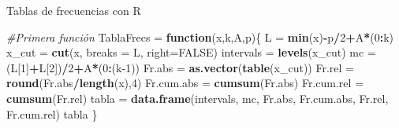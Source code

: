 \documentclass[
  ignorenonframetext,
  aspectratio=169]{beamer}
\newenvironment{Shaded}{\begin{snugshade}}{\end{snugshade}}
\newcommand{\AttributeTok}[1]{\textcolor[rgb]{0.13,0.29,0.53}{#1}}
\newcommand{\CommentTok}[1]{\textcolor[rgb]{0.56,0.35,0.01}{\textit{#1}}}
\newcommand{\ConstantTok}[1]{\textcolor[rgb]{0.56,0.35,0.01}{#1}}
\newcommand{\ControlFlowTok}[1]{\textcolor[rgb]{0.13,0.29,0.53}{\textbf{#1}}}
\newcommand{\DecValTok}[1]{\textcolor[rgb]{0.00,0.00,0.81}{#1}}
\newcommand{\FunctionTok}[1]{\textcolor[rgb]{0.13,0.29,0.53}{\textbf{#1}}}
\newcommand{\NormalTok}[1]{#1}
\newcommand{\OtherTok}[1]{\textcolor[rgb]{0.56,0.35,0.01}{#1}}
\newcommand{\SpecialCharTok}[1]{\textcolor[rgb]{0.81,0.36,0.00}{\textbf{#1}}}
\begin{document}
\begin{frame}[fragile]{Tablas de frecuencias con R}
\label{tablas-de-frecuencias-con-r}
\begin{Shaded}
\begin{Highlighting}[]
\CommentTok{\#Primera función}
\NormalTok{TablaFrecs }\OtherTok{=} \ControlFlowTok{function}\NormalTok{(x,k,A,p)\{ }
\NormalTok{  L }\OtherTok{=} \FunctionTok{min}\NormalTok{(x)}\SpecialCharTok{{-}}\NormalTok{p}\SpecialCharTok{/}\DecValTok{2}\SpecialCharTok{+}\NormalTok{A}\SpecialCharTok{*}\NormalTok{(}\DecValTok{0}\SpecialCharTok{:}\NormalTok{k)}
\NormalTok{  x\_cut }\OtherTok{=} \FunctionTok{cut}\NormalTok{(x, }\AttributeTok{breaks =}\NormalTok{ L, }\AttributeTok{right=}\ConstantTok{FALSE}\NormalTok{)}
\NormalTok{  intervals }\OtherTok{=} \FunctionTok{levels}\NormalTok{(x\_cut)}
\NormalTok{  mc }\OtherTok{=}\NormalTok{ (L[}\DecValTok{1}\NormalTok{]}\SpecialCharTok{+}\NormalTok{L[}\DecValTok{2}\NormalTok{])}\SpecialCharTok{/}\DecValTok{2}\SpecialCharTok{+}\NormalTok{A}\SpecialCharTok{*}\NormalTok{(}\DecValTok{0}\SpecialCharTok{:}\NormalTok{(k}\DecValTok{{-}1}\NormalTok{))}
\NormalTok{  Fr.abs }\OtherTok{=} \FunctionTok{as.vector}\NormalTok{(}\FunctionTok{table}\NormalTok{(x\_cut)) }
\NormalTok{  Fr.rel }\OtherTok{=} \FunctionTok{round}\NormalTok{(Fr.abs}\SpecialCharTok{/}\FunctionTok{length}\NormalTok{(x),}\DecValTok{4}\NormalTok{) }
\NormalTok{  Fr.cum.abs }\OtherTok{=} \FunctionTok{cumsum}\NormalTok{(Fr.abs) }
\NormalTok{  Fr.cum.rel }\OtherTok{=} \FunctionTok{cumsum}\NormalTok{(Fr.rel)}
\NormalTok{  tabla }\OtherTok{=} \FunctionTok{data.frame}\NormalTok{(intervals, mc, Fr.abs, Fr.cum.abs, Fr.rel, Fr.cum.rel)}
\NormalTok{  tabla}
\NormalTok{  \}}
\end{Highlighting}
\end{Shaded}
\end{frame}
\end{document}
